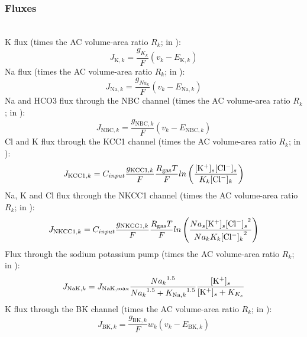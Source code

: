 \subsubsection*{Fluxes}\label{sec:EqNeAcflux}~\\ 
%
\gls{K} flux (times the AC volume-area ratio $R_k$; in \uMmps): 
\begin{equation} \label{eq:J_K}
J_{\text{K},k}=\frac{g_{K_{k}}}{F}(v_k - E_{\text{K},k})
\end{equation}
%
\gls{Na} flux (times the AC volume-area ratio $R_k$; in \uMmps):
\begin{equation} \label{eq:J_Na}
J_{\text{Na},k}=\frac{g_{Na_{k}}}{F}(v_k - E_{\text{Na},k})
\end{equation}
%
\gls{Na} and \gls{HCO3} flux through the NBC channel  (times the AC volume-area ratio $R_k$; in \uMmps): 
\begin{equation} \label{eq:J_NBC}
J_{\text{NBC},k}=\frac{g_{\text{NBC},k}}{F}\left(  v_k -E_{\text{NBC},k}  \right)
\end{equation}
%
\gls{Cl} and \gls{K} flux through the KCC1 channel  (times the AC volume-area ratio $R_k$; in \uMmps): 
\begin{equation} \label{eq:J_KCC1}
J_{\text{KCC1},k}=C_{input}\frac{g_{\text{KCC1},k}}{F}\frac{R_{\text{gas}}T}{F}ln \left(\frac{[\text{K$^+$}]_s [\text{Cl$^-$}]_s }{K_k [\text{Cl$^-$}]_k}\right)
\end{equation}
%
\gls{Na}, \gls{K} and \gls{Cl} flux through the NKCC1 channel   (times the AC volume-area ratio $R_k$; in \uMmps): 
\begin{equation} \label{eq:J_NKCC1}
J_{\text{NKCC1},k}=C_{input}\frac{g_{\text{NKCC1},k}}{F}\frac{R_{\text{gas}}T}{F}ln \left(\frac{Na_s [\text{K$^+$}]_s {[\text{Cl$^-$}]_s}^2}{Na_k K_k {[\text{Cl$^-$}]_k}^2}\right)
\end{equation}
%
Flux through the sodium potassium pump   (times the \gls{AC} volume-area ratio $R_k$; in \uMmps): 
\begin{equation} \label{eq:J_NaK_s}
J_{\text{NaK},k}=J_{\text{NaK,max}}\frac{{Na_k}^{1.5}}{{Na_k}^{1.5}+{K_{\text{Na},k}}^{1.5}}\frac{[\text{K$^+$}]_s}{[\text{K$^+$}]_s+K_{K_s}}
\end{equation}
%
\gls{K} flux through the BK channel  (times the \gls{AC} volume-area ratio $R_k$; in \uMmps): 
\begin{equation} \label{eq:J_BK}
J_{\text{BK},k}=\frac{g_{\text{BK},k}}{F}w_k \left(v_k - E_{\text{BK},k} \right)
\end{equation}
%
%
%
